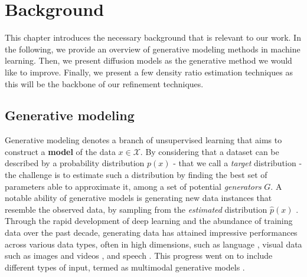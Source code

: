 %
\chapter{Background}\label{sec:diffusion}

This chapter introduces the necessary background that is relevant to our work. In the following, we provide an overview of generative modeling methods in machine learning. Then, we present diffusion models as the generative method we would like to improve. Finally, we present a few density ratio estimation techniques as this will be the backbone of our refinement techniques. 

\section{Generative modeling}\label{sec:related:sec1}


Generative modeling denotes a branch of unsupervised learning that aims to construct a \textbf{model} of the data $x \in \mathcal{X}$. By considering that a dataset can be described by a probability distribution $p(x)$ - that we call a \textit{target} distribution - the challenge is to estimate such a distribution by finding the best set of parameters able to approximate it, among a set of potential \textit{generators} $G$. A notable ability of generative models is generating new data instances that resemble the observed data, by sampling from the \textit{estimated} distribution $\hat{p}(x)$ .
Through the rapid development of deep learning and the abundance of training data over the past decade, generating data has attained impressive performances across various data types, often in high dimensions, such as language \citep{openai2024gpt4technicalreport}, visual data such as images \citep{rombach2022highresolutionimagesynthesislatent} and videos \citep{videoworldsimulators2024}, and speech \citep{wavenet}. This progress went on to include different types of input, termed as multimodal generative models \citep{Suzuki_2022}.

